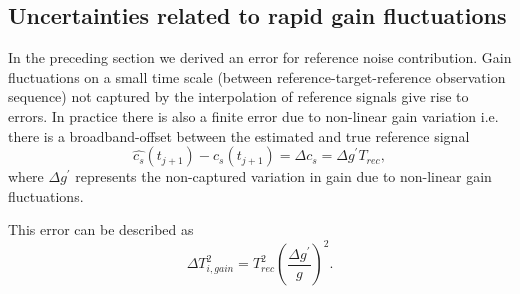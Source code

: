 \subsection{Uncertainties related to rapid gain fluctuations}
\label{sec:gainvar}
In the preceding section we derived an error for reference noise contribution.
%
Gain fluctuations on a small time scale (between reference-target-reference
observation sequence) not captured by the interpolation of reference signals
give rise to errors.
In practice there is also a finite error due to non-linear gain variation 
i.e. there is a broadband-offset between the estimated and true reference signal
\begin{equation}
\hat{c_{s}}(t_{j+1}) - c_{s}(t_{j+1}) = \Delta c_{s} = \Delta g^{'} T_{rec},
\end{equation}
where \(\Delta g^{'}\) represents the non-captured variation in gain
due to non-linear gain fluctuations.

This error can be described as
\begin{equation}
\Delta T_{i,gain}^2 = T_{rec}^{2}\left(\frac{\Delta g^{'}}{g}\right)^{2}.
\label{eq:gainvar}
\end{equation}

